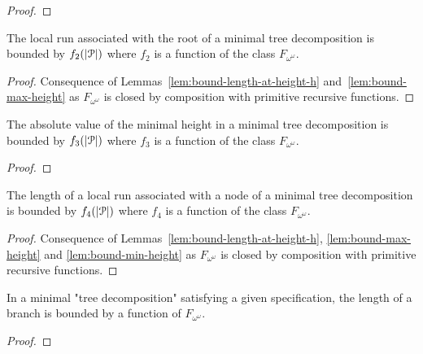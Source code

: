 \begin{proof}
\end{proof}

\begin{corollary}
	The local run associated with the root of a minimal tree decomposition is bounded by $f_2(|\mathcal{P}|)$ where $f_2$ is a function of the class $F_{\omega^\omega}$.
\end{corollary}

\begin{proof}
	Consequence of Lemmas~\ref{lem:bound-length-at-height-h} and~\ref{lem:bound-max-height} as $F_{\omega^\omega}$ is closed by composition with primitive recursive functions.
\end{proof}

\begin{lemma}
	\label{lem:bound-min-height}
	The absolute value of the minimal height in a minimal tree decomposition is bounded by $f_3(|\mathcal{P}|)$ where $f_3$ is a function of the class $F_{\omega^\omega}$.
\end{lemma}

\begin{proof}
\end{proof}

\begin{corollary}
	\label{lem:bound-node-size}
	The length of a local run associated with a node of a minimal tree decomposition is bounded by $f_4(|\mathcal{P}|)$ where $f_4$ is a function of the class $F_{\omega^\omega}$.
\end{corollary}

\begin{proof}
	Consequence of Lemmas~\ref{lem:bound-length-at-height-h}, \ref{lem:bound-max-height} and \ref{lem:bound-min-height} as $F_{\omega^\omega}$ is closed by composition with primitive recursive functions.
\end{proof}

\begin{proposition}
	In a minimal "tree decomposition" satisfying a given specification, the length of a branch is bounded by a function of $F_{\omega^\omega}$.
\end{proposition}

\begin{proof}
\end{proof}

%





